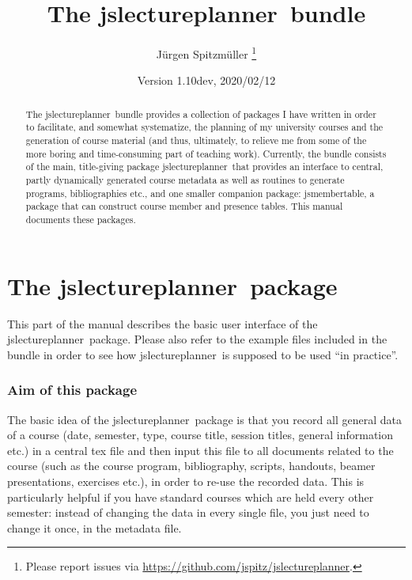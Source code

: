 \documentclass[english]{article}
\newcommand*\jslp{\textsf{jslectureplanner}}
\newcommand*\jsmt{\textsf{jsmembertable}}
\begin{document}
\title{The \jslp\ bundle}

\author{Jürgen Spitzmüller%
\thanks{Please report issues via \protect\url{https://github.com/jspitz/jslectureplanner}.}}

\date{Version 1.10dev, 2020/02/12}

\maketitle

\begin{abstract}
\noindent The \jslp\ bundle provides a collection of packages
I have written in order to facilitate, and somewhat systematize,
the planning of my university courses and the generation of course material
(and thus, ultimately, to relieve me from some of the more boring and
time-consuming part of teaching work).
Currently, the bundle consists of the main, title-giving package \jslp\
that provides an interface to central, partly dynamically generated course
metadata as well as routines to generate programs, bibliographies etc., and one
smaller companion package: \jsmt, a package that can construct course
member and presence tables. This manual documents these packages.
\end{abstract}

\tableofcontents

\clearpage

\part{The \jslp\ package}

This part of the manual describes the basic user interface of the
\jslp\ package.
Please also refer to the example files included in the bundle in order to
see how \jslp\ is supposed to be used ``in practice''.

\section{Aim of this package}

The basic idea of the \jslp\ package is that you record
all general data of a course (date, semester, type, course title, session titles,
general information etc.) in a central tex file and then input this
file to all documents related to the course (such as the course program,
bibliography, scripts, handouts, beamer presentations, exercises etc.),
in order to re-use the recorded data.
This is particularly helpful if you have standard courses which
are held every other semester: instead of changing the data in every
single file, you just need to change it once, in the metadata file.
\end{document}
